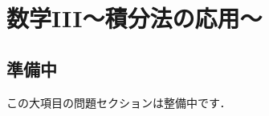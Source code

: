 \documentclass[../../ms_q.tex]{subfiles}
\begin{document}
\section{数学III～積分法の応用～}

\subsection*{準備中}
この大項目の問題セクションは整備中です．
\end{document}

